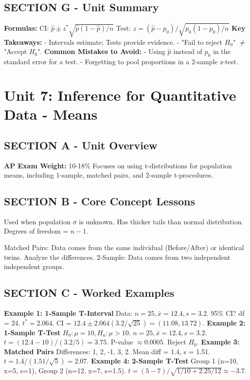 \section{SECTION G - Unit Summary}
\begin{lessonbox}
\textbf{Formulas:}
CI: $\hat{p} \pm z^* \sqrt{\hat{p}(1-\hat{p})/n}$
Test: $z = (\hat{p} - p_0)/\sqrt{p_0(1-p_0)/n}$
\textbf{Key Takeaways:}
- Intervals estimate; Tests provide evidence.
- "Fail to reject $H_0$" $\neq$ "Accept $H_0$".
\textbf{Common Mistakes to Avoid:}
- Using $\hat{p}$ instead of $p_0$ in the standard error for a test.
- Forgetting to pool proportions in a 2-sample z-test.
\end{lessonbox}

\chapter{Unit 7: Inference for Quantitative Data - Means}

\section{SECTION A - Unit Overview}
\textbf{AP Exam Weight:} 10-18\%
Focuses on using t-distributions for population means, including 1-sample, matched pairs, and 2-sample t-procedures.

\section{SECTION B - Core Concept Lessons}
\begin{lessonbox}
Used when population $\sigma$ is unknown. Has thicker tails than normal distribution. Degrees of freedom = $n-1$.
\end{lessonbox}
\begin{lessonbox}
Matched Pairs: Data comes from the same individual (Before/After) or identical twins. Analyze the differences.
2-Sample: Data comes from two independent independent groups.
\end{lessonbox}

\section{SECTION C - Worked Examples}
\textbf{Example 1: 1-Sample T-Interval}
Data: $n=25, \bar{x}=12.4, s=3.2$. 95\% CI? df = 24. $t^* = 2.064$. CI = $12.4 \pm 2.064(3.2/\sqrt{25}) = (11.08, 13.72)$.
\textbf{Example 2: 1-Sample T-Test}
$H_0: \mu=10, H_a: \mu>10$. $n=25, \bar{x}=12.4, s=3.2$. $t = (12.4-10)/(3.2/5) = 3.75$. P-value $\approx 0.0005$. Reject $H_0$.
\textbf{Example 3: Matched Pairs}
Differences: 1, 2, -1, 3, 2. Mean diff = 1.4, s = 1.51. $t = 1.4 / (1.51/\sqrt{5}) = 2.07$.
\textbf{Example 4: 2-Sample T-Test}
Group 1 (n=10, x=5, s=1), Group 2 (n=12, x=7, s=1.5). $t = (5-7)/\sqrt{1/10 + 2.25/12} \approx -3.7$.

